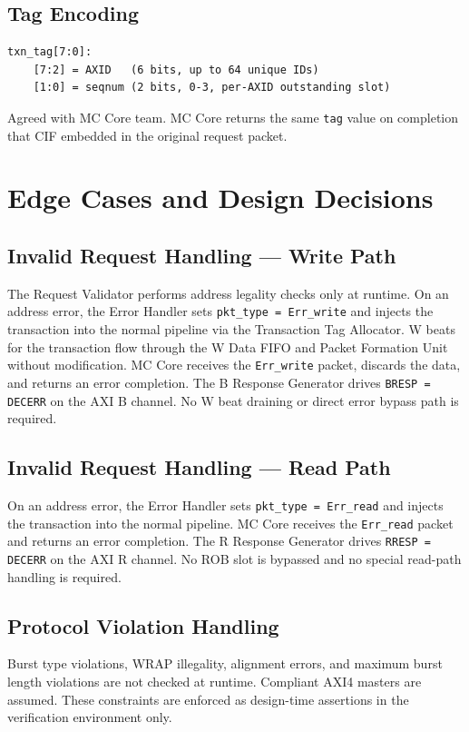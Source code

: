 \documentclass[11pt, a4paper]{article}
\begin{document}
\subsection{Tag Encoding}

\begin{lstlisting}
txn_tag[7:0]:
    [7:2] = AXID   (6 bits, up to 64 unique IDs)
    [1:0] = seqnum (2 bits, 0-3, per-AXID outstanding slot)
\end{lstlisting}

Agreed with MC Core team. MC Core returns the same \texttt{tag} value on completion that CIF embedded in the original request packet.

\section{Edge Cases and Design Decisions}

\subsection{Invalid Request Handling — Write Path}
The Request Validator performs address legality checks only at runtime. On an address error, the Error Handler sets \texttt{pkt\_type = Err\_write} and injects the transaction into the normal pipeline via the Transaction Tag Allocator. W beats for the transaction flow through the W Data FIFO and Packet Formation Unit without modification. MC Core receives the \texttt{Err\_write} packet, discards the data, and returns an error completion. The B Response Generator drives \texttt{BRESP = DECERR} on the AXI B channel. No W beat draining or direct error bypass path is required.

\subsection{Invalid Request Handling — Read Path}
On an address error, the Error Handler sets \texttt{pkt\_type = Err\_read} and injects the transaction into the normal pipeline. MC Core receives the \texttt{Err\_read} packet and returns an error completion. The R Response Generator drives \texttt{RRESP = DECERR} on the AXI R channel. No ROB slot is bypassed and no special read-path handling is required.

\subsection{Protocol Violation Handling}
Burst type violations, WRAP illegality, alignment errors, and maximum burst length violations are not checked at runtime. Compliant AXI4 masters are assumed. These constraints are enforced as design-time assertions in the verification environment only.
\end{document}
